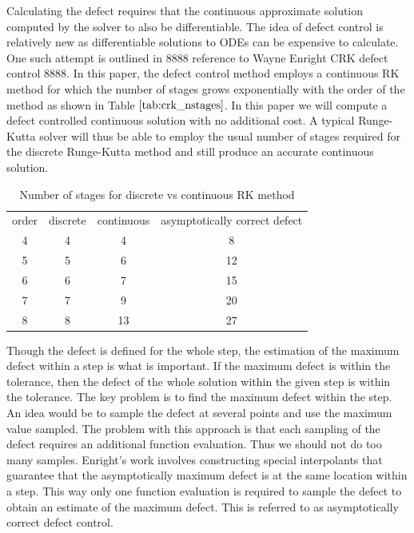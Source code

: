 \documentclass{article}
\begin{document}
Calculating the defect requires that the continuous approximate solution computed by the solver to also be differentiable. The idea of defect control is relatively new as differentiable solutions to ODEs can be expensive to calculate. One such attempt is outlined in 8888 reference to Wayne Enright CRK defect control 8888. In this paper, the defect control method employs a continuous RK method for which the number of stages grows exponentially with the order of the method as shown in Table $\ref{tab:crk_nstages}$. In this paper we will compute a defect controlled continuous solution with no additional cost. A typical Runge-Kutta solver will thus be able to employ the usual number of stages required for the discrete Runge-Kutta method and still produce an accurate continuous solution.

\begin{table}[h]
\caption {Number of stages for discrete vs continuous RK method} 
\label{tab:crk_nstages}
\begin{center}
\begin{tabular}{ c c c c} 
order   & discrete & continuous & asymptotically correct defect \\ 
4 & 4  & 4   & 8 \\ 
5 & 5  & 6   & 12 \\ 
6 & 6  & 7   & 15 \\ 
7 & 7  & 9   & 20 \\ 
8 & 8  & 13  & 27 \\ 
\end{tabular}
\end{center}
\end{table}

Though the defect is defined for the whole step, the estimation of the maximum defect within a step is what is important. If the maximum defect is within the tolerance, then the defect of the whole solution within the given step is within the tolerance. The key problem is to find the maximum defect within the step. An idea would be to sample the defect at several points and use the maximum value sampled. The problem with this approach is that each sampling of the defect requires an additional function evaluation. Thus we should not do too many samples. Enright's work involves constructing special interpolants that guarantee that the asymptotically maximum defect is at the same location within a step. This way only one function evaluation is required to sample the defect to obtain an estimate of the maximum defect. This is referred to as asymptotically correct defect control.
\end{document}
